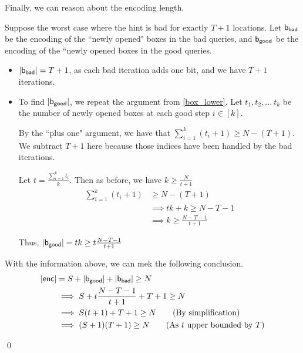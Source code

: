 Finally, we can reason about the encoding length. 

Suppose the worst case where the hint is bad for exactly $T+1$ locations. Let ${\sf b_{bad}}$ be the encoding of the ``newly opened" boxes in the bad queries, and ${\sf b_{good}}$ be the encoding of the ``newly opened boxes in the good queries.
\begin{itemize}
    \item $|{\sf b_{bad}}| = T + 1$, as each bad iteration adds one bit, and we have $T+1$ iterations.
    \item To find $|{\sf b_{good}}|$, we repeat the argument from \ref{box_lower}. Let $t_1, t_2, ...\ t_k$ be the number of newly opened boxes at each good step $i \in [k]$.

    By the ``plus one" argument, we have that $\sum_{i = 1}^k (t_i + 1)\ge N - (T + 1)$. We subtract $T + 1$ here because those indices have been handled by the bad iterations.
    
    Let $t = \frac{\sum_{i = 1}^k t_i}{k}$. Then as before, we have $k\ge \frac{N}{t+1}$
    \begin{align*}
        \sum_{i = 1}^k (t_i + 1)&\ge N - (T + 1) \\
        &\implies tk + k \ge N - T - 1 \\
        &\implies k \ge \frac{N - T - 1}{t+1}
    \end{align*}

    Thus, $|{\sf b_{good}}| = tk \ge t\frac{N - T - 1}{t+1}$
\end{itemize}

With the information above, we can mek the following conclusion.
\begin{align*}
    |{\sf enc}| &= S + |{\sf b_{good}}| + |{\sf b_{bad}}| \ge N \\
    &\implies S + t\frac{N - T - 1}{t+1} + T + 1 \ge N \\
    &\implies S(t+1) + T + 1 \ge N \tag{By simplification}\\
    &\implies (S+1)(T+1) \ge N \tag{As $t$ upper bounded by $T$}
\end{align*}

\qed

